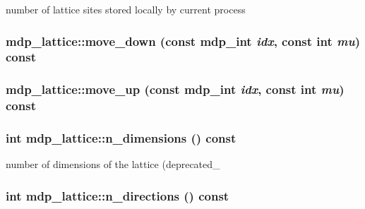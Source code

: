 number of lattice sites stored locally by current process \hypertarget{classmdp__lattice_a9304b6cc18f178e2fcec73c3b8b9d76d}{
\subsubsection[{move\_\-down}]{ mdp\_\-lattice::move\_\-down (const {\bf mdp\_\-int} {\em idx}, \/  const int {\em mu}) const}}
\label{classmdp__lattice_a9304b6cc18f178e2fcec73c3b8b9d76d}
\hypertarget{classmdp__lattice_a496a60d5988294a9d0da7b635005d410}{
\subsubsection[{move\_\-up}]{ mdp\_\-lattice::move\_\-up (const {\bf mdp\_\-int} {\em idx}, \/  const int {\em mu}) const}}
\label{classmdp__lattice_a496a60d5988294a9d0da7b635005d410}
\hypertarget{classmdp__lattice_a7e99975b0536e5f46acc8b72778c077f}{
\subsubsection[{n\_\-dimensions}]{\setlength{\rightskip}{0pt plus 5cm}int mdp\_\-lattice::n\_\-dimensions () const}}
\label{classmdp__lattice_a7e99975b0536e5f46acc8b72778c077f}


number of dimensions of the lattice (deprecated\_\- \hypertarget{classmdp__lattice_aa8452324840f85cf188ce7fffe488d98}{
\subsubsection[{n\_\-directions}]{\setlength{\rightskip}{0pt plus 5cm}int mdp\_\-lattice::n\_\-directions () const}}
\label{classmdp__lattice_aa8452324840f85cf188ce7fffe488d98}


